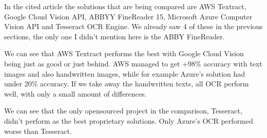 \documentclass[
  digital,     %
  oneside,     %
  nosansbold,  %
  nocolorbold, %
  nolof,         %
  nolot,         %
]{fithesis4}
\begin{document}
In the cited article the solutions that are being compared are AWS Textract\cite{awstextract}, Google Cloud Vision API\cite{googleapi}, ABBYY FineReader 15, Microsoft Azure Computer Vision API\cite{azurevision} and Tesseract OCR Engine\cite{tesseract}. We already saw 4 of these in the previous sections, the only one I didn't mention here is the ABBY FineReader.

We can see that AWS Textract performs the best with Google Cloud Vision being just as good or just behind. AWS managed to get +98\% accuracy with text images and also handwritten images, while for example Azure's solution had under 20\% accuracy. If we take away the handwritten texts, all OCR perform well, with only a small amount of differences.

We can see that the only opensourced project in the comparison, Tesseract, didn't perform as the best proprietary solutions. Only Azure's OCR performed worse than Tesseract.
\end{document}
